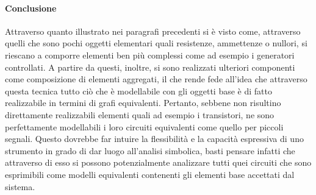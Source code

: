 \paragraph{Conclusione}
Attraverso quanto illustrato nei paragrafi precedenti si è visto come, attraverso quelli che sono pochi oggetti elementari quali resistenze, ammettenze o nullori, si riescano a comporre elementi ben più complessi come ad esempio i generatori controllati. A partire da questi, inoltre, si sono realizzati ulteriori componenti come composizione di elementi aggregati, il che rende fede all'idea che attraverso questa tecnica tutto ciò che è modellabile con gli oggetti base è di fatto realizzabile in termini di grafi equivalenti. Pertanto, sebbene non risultino direttamente realizzabili elementi quali ad esempio i transistori, ne sono perfettamente modellabili i loro circuiti equivalenti come quello per piccoli segnali. Questo dovrebbe far intuire la flessibilità e la capacità espressiva di uno strumento in grado di dar luogo all'analisi simbolica, basti pensare infatti che attraverso di esso si possono potenzialmente analizzare tutti quei circuiti che sono esprimibili come modelli equivalenti contenenti gli elementi base accettati dal sistema.
